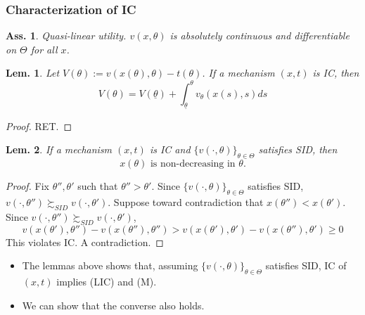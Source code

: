 \documentclass[11pt,a4paper,dvipdfmx]{article}
\theoremstyle{plain}
\newtheorem{lem}{Lem.}[section]
\newtheorem{ass}{Ass.}
\newcommand{\1}{\mathbbm{1}}
\DeclareMathOperator*{\argmax}{argmax}
\begin{document}
\subsubsection{Characterization of IC}
\begin{ass}
	Quasi-linear utility. $v(x, \theta)$ is absolutely continuous and differentiable on $\Theta$ for all $x$.
\end{ass}

\begin{lem}
	Let $V(\theta) := v(x(\theta), \theta) - t(\theta)$.
	If a mechanism $(x,t)$ is IC, then
	\begin{equation}
	V(\theta) = V(\underline{\theta}) + \int_{\underline{\theta}}^\theta
	 v_\theta(x(s), s) ds \tag{LIC}	
	\end{equation}
\end{lem}
\begin{proof}
	RET.
\end{proof}

\begin{lem}
	If a mechanism $(x,t)$ is IC and $\{v(\cdot, \theta)\}_{\theta \in \Theta}$ satisfies SID, then
	\begin{equation}
	\text{$x(\theta)$ is non-decreasing in $\theta$.} \tag{M}
	\end{equation}
\end{lem}
\begin{proof}
	Fix $\theta'', \theta'$ such that $\theta'' > \theta'$. Since $\{v(\cdot, \theta)\}_{\theta \in \Theta}$ satisfies SID, $v(\cdot, \theta'') \succsim_{SID} v(\cdot, \theta')$.
	Suppose toward contradiction that $x(\theta'') < x(\theta')$. Since $v(\cdot, \theta'') \succsim_{SID} v(\cdot, \theta')$,
	\[
	v(x(\theta'), \theta'') - v(x(\theta''), \theta'')
	> v(x(\theta'), \theta') - v(x(\theta''), \theta') \geq 0
	\]
	This violates IC. A contradiction.
\end{proof}

\begin{itemize}
	\item The lemmas above shows that, assuming $\{v(\cdot, \theta)\}_{\theta \in \Theta}$ satisfies SID, IC of $(x,t)$ implies (LIC) and (M).
	\item We can show that the converse also holds.
\end{itemize}
\end{document}
